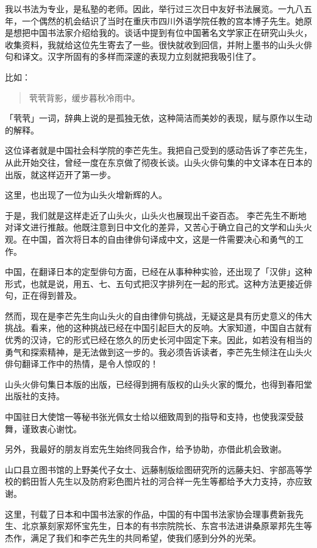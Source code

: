 {    我以书法为专业，是私塾的老师。因此，举行过三次日中友好书法展览。一九八五年，一个偶然的机会结识了当时在重庆市四川外语学院任教的宫本博子先生。她原是想把中国书法家介绍给我的。谈话中提到有位中国著名文学家正在研究山头火，收集资料，我就给这位先生寄去了一些。很快就收到回信，并附上墨书的山头火俳句和译文。汉字所固有的多样而深邃的表现力立刻就把我吸引住了。

    比如：
    \begin{quote}
        茕茕背影，缓步暮秋冷雨中。
    \end{quote}

    「茕茕」一词，辞典上说的是孤独无依，这种简洁而美妙的表现，赋与原作以生动的解释。

    这位译者就是中国社会科学院的李芒先生。我把自己受到的感动告诉了李芒先生，从此开始交往，曾经一度在东京做了彻夜长谈。山头火俳句集的中文译本在日本的出版，就这样迈开了第一步。

    这里，也出现了一位为山头火增新辉的人。

    于是，我们就是这样走近了山头火，山头火也展现出千姿百态。
    李芒先生不断地对译文进行推敲。他既注意到日中文化的差异，又苦心于确立自己的文学和山头火观。在中国，首次将日本的自由律俳句译成中文，这是一件需要决心和勇气的工作。

    中国，在翻译日本的定型俳句方面，已经在从事种种实验，还出现了「汉俳」这种形式，也就是说，用五、七、五句式把汉字排列在一起的形式。这种方法更接近俳句，正在得到普及。

    然而，现在是李芒先生向山头火的自由律俳句挑战，无疑这是具有历史意义的伟大挑战。看来，他的这种挑战已经在中国引起巨大的反响。大家知道，中国自古就有优秀的汉诗，它的形式已经在悠久的历史长河中固定下来。因此，如若没有相当的勇气和探索精神，是无法做到这一步的。我必须告诉读者，李芒先生倾注在山头火俳句翻译工作中的热情，是令人惊叹的！

    山头火俳句集日本版的出版，已经得到拥有版权的山头火家的慨允，也得到春阳堂出版社的支持。

    中国驻日大使馆一等秘书张光佩女士给以细致周到的指导和支持，也使我深受鼓舞，谨致衷心谢忱。

    另外，我最好的朋友肖宏先生始终同我合作，给予协助，亦借此机会致谢。

    山口县立图书馆的上野美代子女士、远藤制版绘图研究所的远藤夫妇、宇部高等学校的鹤田哲人先生以及防府彩色图片社的河合祥一先生等都给予大力支持，亦应致谢。

    这里，刊载了日本和中国书法家的作品，中国的有中国书法家协会理事费新我先生、北京篆刻家郑怀宝先生，日本的有书宗院院长、东宫书法进讲桑原翠邦先生等杰作，满足了我们和李芒先生的共同希望，使我们感到分外的光荣。

}
